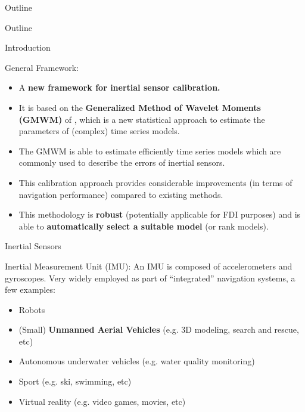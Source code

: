 \documentclass[envcountsect,usenames,dvipsnames]{beamer}
\theoremstyle{mystyle}
\begin{document}
\begin{frame}{Outline}
\small
\begin{multicols}{2}
  \tableofcontents
\end{multicols}
\end{frame}

\begin{frame}{Outline}
\small
\begin{multicols}{2}
  \tableofcontents[currentsection]
\end{multicols}
\end{frame}

\begin{frame}{Introduction}
\begin{block}{{General Framework:}}
	\begin{itemize}
		\item A \textbf{{\color{beamer@UIUCblue} new framework for inertial sensor calibration.}}
		\item It is based on the \textbf{{\color{beamer@UIUCblue}Generalized Method of Wavelet Moments (GMWM)}} of \cite{guerrier2013wavelet}, which is a new statistical approach to estimate the parameters of (complex) time series models.
		\item The GMWM is able to estimate efficiently time series models which are commonly used to describe the errors of inertial sensors.
		\item This calibration approach provides considerable improvements (in terms of navigation performance) compared to existing methods.
		\item This methodology is \textbf{{\color{beamer@UIUCblue}robust}} (potentially applicable for FDI purposes) and is able to \textbf{{\color{beamer@UIUCblue}automatically select a suitable model}} (or rank models).
	\end{itemize}
\end{block}
\end{frame}

\begin{frame}{Inertial Sensors} 
	\begin{exampleblock}{Inertial Measurement Unit (IMU):}
		An IMU is composed of accelerometers and gyroscopes. Very widely employed as part of ``integrated'' navigation systems, a few examples:
		\begin{itemize}
			\item Robots
			\item (Small) \textbf{{\color{beamer@UIUCblue}Unmanned Aerial Vehicles}} (e.g. 3D modeling, search and rescue, etc)
			\item Autonomous underwater vehicles (e.g. water quality monitoring)
			\item Sport (e.g. ski, swimming, etc)
			\item Virtual reality (e.g. video games, movies, etc) %
		\end{itemize} 
	\end{exampleblock}
\end{frame}
\end{document}
